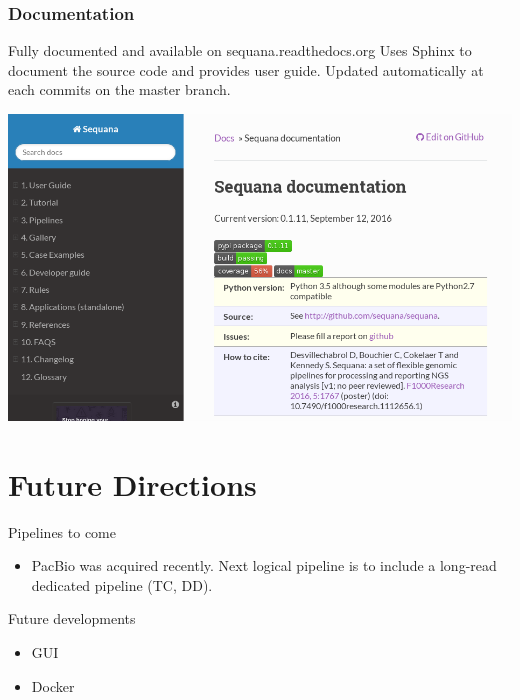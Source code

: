 \documentclass{beamer}
\begin{document}
\begin{frame}[fragile]
    \frametitle{Documentation}
    Fully documented and available on sequana.readthedocs.org
    Uses Sphinx to document the source code and provides user guide.
    Updated automatically at each commits on the master branch.
\begin{center}
\includegraphics[scale=0.3]{images/rtd}
\end{center}
    
\end{frame}


\section{Future Directions}

\begin{frame}
\begin{block}{Pipelines to come}
\begin{itemize}
 \item PacBio was acquired recently. Next logical pipeline is to include
 a long-read dedicated pipeline (TC, DD). 
 
\end{itemize}
\end{block}

\begin{block}{Future developments}
 \begin{itemize}
  \item GUI 
  \item Docker
 \end{itemize}
\end{block}
 \end{frame}
\end{document}
